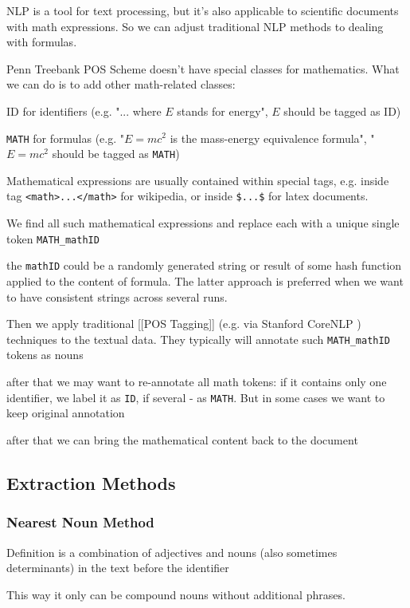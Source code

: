 NLP is a tool for text processing, but it's also applicable to scientific documents with math expressions. So we can adjust traditional NLP methods to dealing with formulas.


Penn Treebank POS Scheme \cite{santorini1990part}  doesn't have special classes for mathematics.
What we can do is to add other math-related classes:

ID for identifiers (e.g. "... where $E$ stands for energy", $E$ should be tagged as ID)

\verb|MATH| for formulas (e.g. "$E = mc^2$ is the mass-energy equivalence formula", "$E = mc^2$ should be tagged as \verb|MATH|)

Mathematical expressions are usually contained within special tags, e.g. inside
tag \verb|<math>...</math>| for wikipedia, or inside \verb|$...$| for
latex documents.

We find all such mathematical expressions and replace each with a unique single token \verb|MATH_mathID|

the \verb|mathID| could be a randomly generated string or result of some hash function
applied to the content of formula. The latter approach is preferred when we want
to have consistent strings across several runs.

Then we apply traditional [[POS Tagging]] (e.g. via Stanford
CoreNLP \cite{manning2014stanford})
techniques to the textual data. They typically will annotate such \verb|MATH_mathID|
tokens as nouns

after that we may want to re-annotate all math tokens: if it contains only
one identifier, we label it as \verb|ID|, if several - as \verb|MATH|. But in some cases
we want to keep original annotation

after that we can bring the mathematical content back to the document



\subsection{Extraction Methods}
\subsubsection{Nearest Noun Method}
Definition is a combination of adjectives and nouns (also sometimes determinants) in the text before the identifier

\cite{grigore2009towards}
\cite{yokoi2011contextual}


This way it only can be compound nouns without additional phrases.


